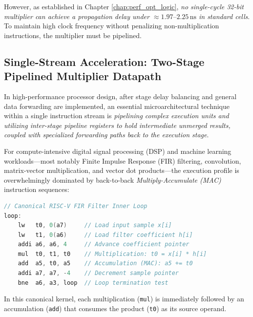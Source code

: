 However, as established in Chapter \ref{chap:perf_opt_logic}, \textit{no single-cycle 32-bit multiplier can achieve a propagation delay under $\approx 1.97\text{--}2.25\,\text{ns}$ in standard cells}. To maintain high clock frequency without penalizing non-multiplication instructions, the multiplier must be pipelined.

\subsection{Single-Stream Acceleration: Two-Stage Pipelined Multiplier Datapath}

In high-performance processor design, after stage delay balancing and general data forwarding are implemented, an essential microarchitectural technique within a single instruction stream is \textit{pipelining complex execution units and utilizing inter-stage pipeline registers to hold intermediate unmerged results, coupled with specialized forwarding paths back to the execution stage}.

For compute-intensive digital signal processing (DSP) and machine learning workloads---most notably Finite Impulse Response (FIR) filtering, convolution, matrix-vector multiplication, and vector dot products---the execution profile is overwhelmingly dominated by back-to-back \textit{Multiply-Accumulate (MAC)} instruction sequences:
\begin{lstlisting}[language=c]
// Canonical RISC-V FIR Filter Inner Loop
loop:
    lw   t0, 0(a7)     // Load input sample x[i]
    lw   t1, 0(a6)     // Load filter coefficient h[i]
    addi a6, a6, 4     // Advance coefficient pointer
    mul  t0, t1, t0    // Multiplication: t0 = x[i] * h[i]
    add  a5, t0, a5    // Accumulation (MAC): a5 += t0
    addi a7, a7, -4    // Decrement sample pointer
    bne  a6, a3, loop  // Loop termination test
\end{lstlisting}
In this canonical kernel, each multiplication (\texttt{mul}) is immediately followed by an accumulation (\texttt{add}) that consumes the product (\texttt{t0}) as its source operand.

